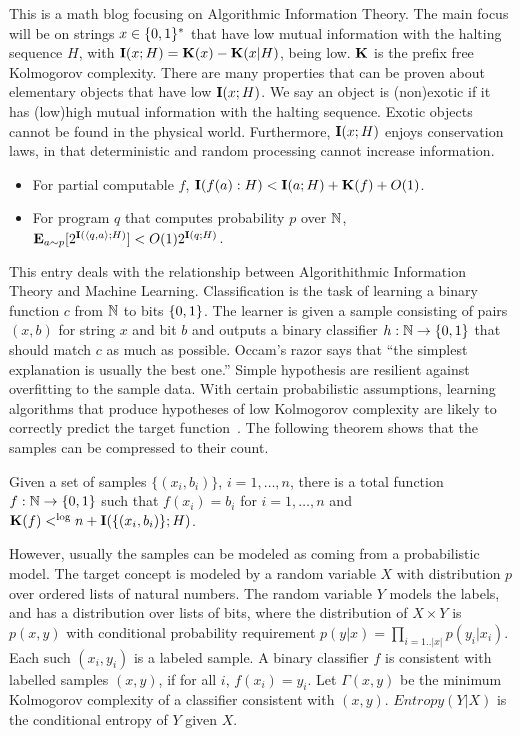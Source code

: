 \documentclass[11pt]{article}\textwidth 6.5in\textheight 9in
\begin{document}
This is a math blog focusing on Algorithmic Information Theory. The main focus will be on strings $x\in\{0,1\}^*$ that have low mutual information with the halting sequence $H$, with ${\mathbf I}(x;H)={\mathbf K}(x)-{\mathbf K}(x|H)$, being low. ${\mathbf K}$ is the prefix free Kolmogorov complexity. There are many properties that can be proven about elementary objects that have low ${\mathbf I}(x;H)$. We say an object is (non)exotic if it has (low)high mutual information with the halting sequence. Exotic objects cannot be found in the physical world. Furthermore, ${\mathbf I}(x;H)$ enjoys conservation laws, in that deterministic and random processing cannot increase information.
\begin{itemize}
\item For partial computable $f$, ${\mathbf I}(f(a):H)< {\mathbf I}(a;H)+{\mathbf K}(f)+O(1)$.
\item For program $q$ that computes probability $p$ over $\mathbb{N}$, ${\mathbf E}_{a\sim p}[2^{{\mathbf I}(\langle q,a\rangle;H)}]< O(1)2^{{\mathbf I}(q;H)}$.
\end{itemize}
This entry deals with the relationship between Algorithithmic Information Theory and Machine Learning. Classification is the task of learning a binary function $c$  from $\mathbb{N}$ to bits $\{0,1\}$. The learner is given a sample consisting of pairs $(x,b)$ for string $x$ and bit $b$ and outputs a binary classifier $h:\mathbb{N}\rightarrow\{0,1\}$ that should match $c$ as much as possible. Occam's razor says that ``the simplest explanation is usually the best one.'' Simple hypothesis are resilient against overfitting to the sample data. With certain probabilistic assumptions, learning algorithms that produce hypotheses of low Kolmogorov complexity are likely to correctly predict the target function~\cite{BlumerEhHaWar89}. The following theorem shows that the samples can be compressed to their count.

\begin{thr}
Given a set of samples $\{(x_i,b_i)\}$, $i=1,\dots,n$, there is a total function $f:\mathbb{N}\rightarrow\{0,1\}$ such that $f(x_i)=b_i$ for $i=1,\dots,n$ and ${\mathbf K}(f)<^{\log} n + {\mathbf I}(\{(x_i,b_i)\};H)$.
\end{thr}


However, usually the samples can be modeled as coming from a probabilistic model. The target concept is modeled by a random variable $X$ with distribution $p$ over ordered lists of natural numbers. The random variable $Y$ models the labels, and has a distribution over lists of bits, where the distribution of $X\times Y$ is $p(x,y)$ with conditional probability requirement $p(y|x)=\prod_{i=1..|x|}p(y_i|x_i)$. Each such $(x_i,y_i)$ is a labeled sample. A binary classifier $f$ is consistent with labelled samples $(x,y)$, if for all $i$, $f(x_i)=y_i$. Let $\Gamma(x,y)$ be the minimum Kolmogorov complexity of a classifier consistent with $(x,y)$. $Entropy(Y|X)$ is the conditional entropy of $Y$ given $X$.
\end{document}
